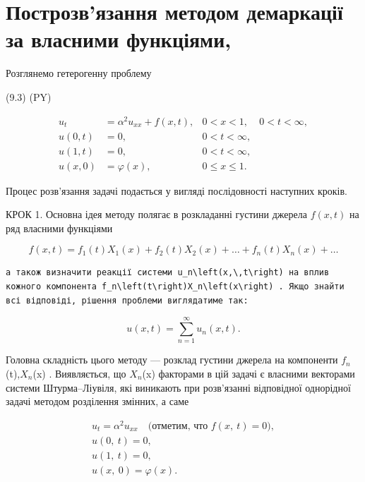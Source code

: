 \documentclass[
  ukrainian,
]{article}
\begin{document}
\section{Построзв'язання методом демаркації за власними
функціями,}\label{ux43fux43eux441ux442ux440ux43eux437ux432ux44fux437ux430ux43dux43dux44f-ux43cux435ux442ux43eux434ux43eux43c-ux434ux435ux43cux430ux440ux43aux430ux446ux456ux457-ux437ux430-ux432ux43bux430ux441ux43dux438ux43cux438-ux444ux443ux43dux43aux446ux456ux44fux43cux438}

Розглянемо гетерогенну проблему

(9.3) (PY)

\[
\begin{aligned} u_t &= \alpha^2 u_{xx} + f(x, t), & 0 < x < 1, & 0 < t < \infty, \\ u(0, t) &= 0, & 0 < t < \infty, \\ u(1, t) &= 0, & 0 < t < \infty, \\ u(x, 0) &= \varphi(x), & 0 \leqslant x \leqslant 1. \end{aligned}
\]

Процес розв'язання задачі подається у вигляді послідовності наступних
кроків.

КРОК 1. Основна ідея методу полягає в розкладанні густини джерела
\(f(x, t)\) на ряд власними функціями

\[
f(x, t) = f_1(t) X_1(x) + f_2(t) X_2(x) + \dots + f_n(t) X_n(x) + \dots
\]

\begin{verbatim}
а також визначити реакції системи u_n\left(x,\,t\right) на вплив кожного компонента f_n\left(t\right)X_n\left(x\right) . Якщо знайти всі відповіді, рішення проблеми виглядатиме так:
\end{verbatim}

\[
u(x, t) = \sum_{n=1}^{\infty} u_n(x, t).
\]

Головна складність цього методу --- розклад густини джерела на
компоненти \(f_n\)(t),\(X_n\)(x) . Виявляється, що \(X_n\)(x) факторами
в цій задачі є власними векторами системи Штурма--Ліувіля, які виникають
при розв'язанні відповідної однорідної задачі методом розділення
змінних, а саме

\[
\begin{array}{c} u_t = \alpha^2 u_{xx} \quad \text{(отметим, что } f(x, \ t) = 0), \\ u(0, \ t) = 0, \\ u(1, \ t) = 0, \\ u(x, \ 0) = \varphi(x). \end{array}
\]
\end{document}
